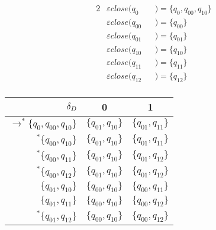 \documentclass[docid=2018/19]{tcom_exam}
\begin{document}
{\begin{minipage}[c]{0.49\textwidth}
\begin{center}
	\end{center}
\end{minipage}
\begin{minipage}[c]{0.49\textwidth}
	\begin{alignat*}{2}
		&\varepsilon close(q_0    && )=\{q_0,q_{00},q_{10}\}\\
		&\varepsilon close(q_{00} && )=\{q_{00}\}\\
		&\varepsilon close(q_{01} && )=\{q_{01}\}\\
		&\varepsilon close(q_{10} && )=\{q_{10}\}\\
		&\varepsilon close(q_{11} && )=\{q_{11}\}\\
		&\varepsilon close(q_{12} && )=\{q_{12}\}\\
	\end{alignat*}
\end{minipage}
\begin{minipage}[c]{0.49\textwidth}
	\begin{center}
		\begin{tabular}{r | c c}
			$\delta_D$                              & 0            & 1           \\ \hline
			$\rightarrow ^* \{q_0,q_{00},q_{10}\} $ & $\{q_{01},q_{10}\}$ & $\{q_{01},q_{11}\}$ \\
			$            ^* \{q_{00},q_{10}     \}$ & $\{q_{01},q_{10}\}$ & $\{q_{01},q_{11}\}$ \\
			$            ^* \{q_{00},q_{11}     \}$ & $\{q_{01},q_{10}\}$ & $\{q_{01},q_{12}\}$ \\
			$            ^* \{q_{00},q_{12}     \}$ & $\{q_{01},q_{10}\}$ & $\{q_{01},q_{12}\}$ \\
			$               \{q_{01},q_{10}     \}$ & $\{q_{00},q_{10}\}$ & $\{q_{00},q_{11}\}$ \\
			$               \{q_{01},q_{11}     \}$ & $\{q_{00},q_{10}\}$ & $\{q_{00},q_{12}\}$ \\
			$            ^* \{q_{01},q_{12}     \}$ & $\{q_{00},q_{10}\}$ & $\{q_{00},q_{12}\}$

\end{tabular}
\end{center}
\end{minipage}}
\end{document}
